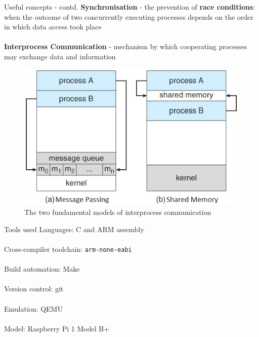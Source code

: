 \documentclass[10pt]{beamer}
\begin{document}
\begin{frame}{Useful concepts - contd.}
    \textbf{Synchronisation} - the prevention of \textbf{race conditions}: when the outcome of two concurrently executing processes depends on the order in which data access took place \\~\\

    \textbf{Interprocess Communication} - mechanism by which cooperating processes may exchange data and information

    \begin{figure}[h]
        \includegraphics[width=.5\textwidth]{ipc.png}
        \caption{The two fundamental models of interprocess communication}
    \end{figure}

\end{frame}

\begin{frame}{Tools used}
    Languages: C and ARM assembly \\~\\
    Cross-compiler toolchain: \texttt{arm-none-eabi} \\~\\
    Build automation: Make \\~\\
    Version control: git \\~\\
    Emulation: QEMU \\~\\
    Model: Raspberry Pi 1 Model B+
\end{frame}
\end{document}
